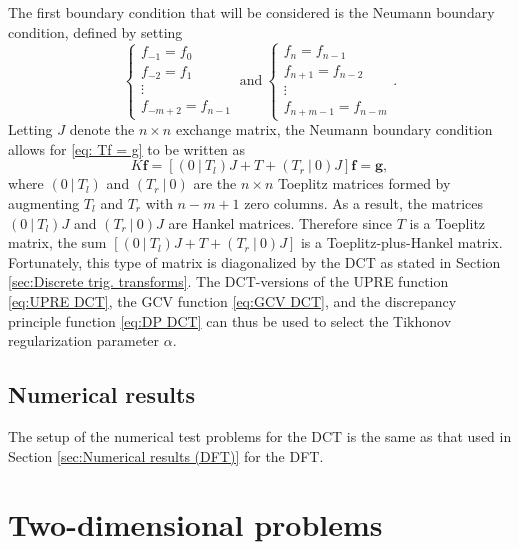 \documentclass[12pt,notitlepage]{report}
\newcommand{\gVec}{\mathbf{g}}	%
\newcommand{\fVec}{\mathbf{f}}	%
\newcommand{\regparam}{\alpha}
\begin{document}
The first boundary condition that will be considered is the Neumann boundary condition, defined by setting
\[\begin{cases}
f_{-1} = f_0 \\
f_{-2} = f_1 \\
\vdots \\
f_{-m+2} = f_{n-1}
\end{cases} ~ \text{and} ~
\begin{cases}
f_{n} = f_{n-1} \\
f_{n+1} = f_{n-2} \\
\vdots \\
f_{n+m-1} = f_{n-m}
\end{cases}.\]
Letting $J$ denote the $n \times n$ exchange matrix, the Neumann boundary condition allows for \eqref{eq: Tf = g} to be written as
\begin{equation}
\label{eq:Neumann Kf = g}
K\fVec = [(0~|~T_{l})J + T + (T_{r}~|~0)J]\fVec = \gVec,
\end{equation}
where $(0~|~T_{l})$ and $(T_{r}~|~0)$ are the $n \times n$ Toeplitz matrices formed by augmenting $T_{l}$ and $T_{r}$ with $n-m+1$ zero columns. As a result, the matrices $(0~|~T_{l})J$ and $(T_{r}~|~0)J$ are Hankel matrices. Therefore since $T$ is a Toeplitz matrix, the sum $[(0~|~T_{l})J + T + (T_{r}~|~0)J]$ is a Toeplitz-plus-Hankel matrix. Fortunately, this type of matrix is diagonalized by the DCT as stated in Section \ref{sec:Discrete trig. transforms}. The DCT-versions of the UPRE function \eqref{eq:UPRE DCT}, the GCV function \eqref{eq:GCV DCT}, and the discrepancy principle function \eqref{eq:DP DCT} can thus be used to select the Tikhonov regularization parameter $\regparam$.

\section{Numerical results} \label{sec:Numerical results (DCT)}
The setup of the numerical test problems for the DCT is the same as that used in Section \ref{sec:Numerical results (DFT)} for the DFT.

\chapter{Two-dimensional problems} \label{ch:2D problems}
\end{document}
